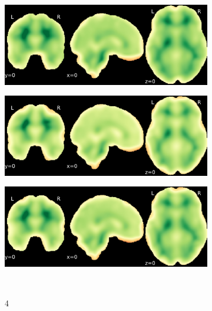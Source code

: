 \documentclass{article}
\begin{document}
\begin{appendices}
\begin{landscape}
\begin{figure}
\begin{subfigure}[t]{0.2\paperheight}
            \end{subfigure}
            \begin{subfigure}[t]{0.2\paperheight}
                \centering
                \includegraphics[width=\textwidth]{figures/sig/15mm/rr_ds000256_sub-CTS201_sig.pdf}
            \end{subfigure}
            \begin{subfigure}[t]{0.2\paperheight}
                \centering
                \includegraphics[width=\textwidth]{figures/sig/15mm/rs_ds000256_sub-CTS201_sig.pdf}
            \end{subfigure}
            \begin{subfigure}[t]{0.2\paperheight}
                \centering
                \includegraphics[width=\textwidth]{figures/sig/15mm/rr.rs_ds000256_sub-CTS201_sig.pdf}
            \end{subfigure} \\
            \begin{subfigure}[b][][c]{0.01\paperwidth} 4 \vspace*{15pt} \end{subfigure}

\end{figure}
\end{landscape}
\end{appendices}
\end{document}
